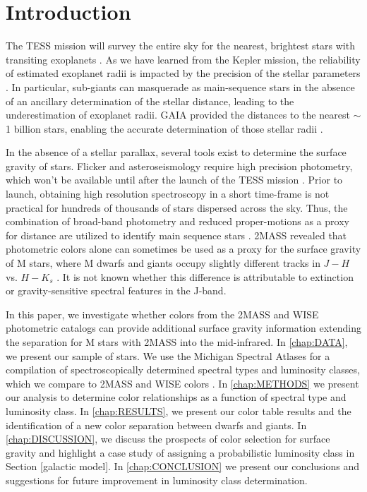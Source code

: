 \chapter{Introduction} \label{chap:INTRO}

The TESS mission will survey the entire sky for the nearest, brightest stars with transiting exoplanets \citep[]{Ricker2015,Sullivan2015}.  As we have learned from the Kepler mission, the reliability of estimated exoplanet radii is impacted by the precision of the stellar parameters \citep[]{Plavchan14,Kane14,Howell14,Bastien14,Mann12}. In particular, sub-giants can masquerade as main-sequence stars in the absence of an ancillary determination of the stellar distance, leading to the underestimation of exoplanet radii. GAIA  provided the distances to the nearest $\sim$1 billion stars, enabling the accurate determination of those stellar radii \citep[]{Prusti2016,Brown2016,Lindegren2016,Stassun2016}. 

In the absence of a stellar parallax, several tools exist to determine the surface gravity of stars.  Flicker and asteroseismology require high precision photometry, which won't be available until after the launch of the TESS mission \citep[]{Bastien2013,Bastien2016}. Prior to launch, obtaining high resolution spectroscopy in a short time-frame is not practical for hundreds of thousands of stars dispersed across the sky.  Thus, the combination of broad-band photometry and reduced proper-motions as a proxy for distance are utilized to identify main sequence stars \citep[]{Bastien2016,Huber2014,Lepine2011,Brown2011,Gould2003}. 2MASS revealed that photometric colors alone can sometimes be used as a proxy for the surface gravity of M stars, where M dwarfs and giants occupy slightly different tracks in $J-H$ vs. $H-K_s$ \citep[]{Ciardi2011,Plavchan2008,Plavchan2006,Skrutskie2006}.  It is not known whether this difference is attributable to extinction or gravity-sensitive spectral features in the J-band.  

In this paper, we investigate whether colors from the 2MASS and WISE photometric catalogs can provide additional surface gravity information extending the separation for M stars with 2MASS into the mid-infrared. In \autoref{chap:DATA}, we present our sample of stars. We use the Michigan Spectral Atlases for a compilation of spectroscopically determined spectral types and luminosity classes, which we compare to 2MASS and WISE colors \citep[]{Houk1982,Houk1988,Houk1999}.  In \autoref{chap:METHODS} we present our analysis to determine color relationships as a function of spectral type and luminosity class.  In \autoref{chap:RESULTS}, we present our color table results and the identification of a new color separation between dwarfs and giants.  In \autoref{chap:DISCUSSION}, we discuss the prospects of color selection for surface gravity and highlight a case study of assigning a probabilistic luminosity class in Section [galactic  model].  In \autoref{chap:CONCLUSION} we present our conclusions and suggestions for future improvement in luminosity class determination.


